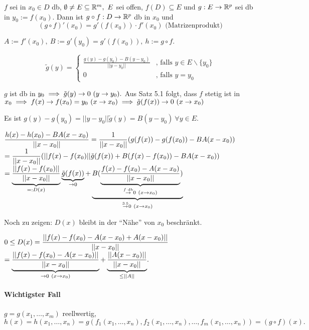 \documentclass[a4paper,twoside,DIV15,BCOR12mm]{scrbook}
\begin{document}
\begin{satz}[Kettenregel]
$f$ sei in $x_0 \in D$ db, $\emptyset \ne E \subseteq \MdR^m,\ E$ sei offen, $f(D) \subseteq E$ und $g:E \to \mathbb{R}^p$ sei db in $y_0 := f(x_0)$. Dann ist $g \circ f: D \to \mathbb{R}^p$ db in $x_0$ und $$(g \circ f)'(x_0) = g'(f(x_0))\cdot f'(x_0)\text{ (Matrizenprodukt)}$$
\end{satz}

\begin{beweis}
$A := f'(x_0),\ B := g'(y_0) = g'(f(x_0)),\ h := g \circ f.$

$$\tilde{g}(y) = \begin{cases}
\frac{g(y)-g(y_0)-B(y-y_0)}{||y-y_0||} & \text{, falls } y \in E\backslash\{y_0\} \\
0                                      & \text{, falls } y = y_0
\end{cases}$$

$g$ ist db in $y_0 \implies \tilde{g}(y) \to 0\ (y \to y_0).$ Aus Satz 5.1 folgt, dass $f$ stetig ist in $x_0 \implies f(x) \to f(x_0) = y_0\ (x \to x_0) \implies \tilde{g}(f(x)) \to 0\ (x \to x_0)$

Es ist $g(y) - g(y_0) = ||y-y_0|| \tilde{g}(y) = B(y-y_0)\ \forall y \in E.$

$\displaystyle{\frac{h(x)-h(x_0)-BA(x-x_0)}{||x-x_0||} = \frac{1}{||x-x_0||}(g(f(x))-g(f(x_0))-BA(x-x_0))}$\\
$\displaystyle{= \frac{1}{||x-x_0||} (||f(x)-f(x_0)|| \tilde{g}(f(x)) + B(f(x)-f(x_0))-BA(x-x_0))}$\\
$\displaystyle{= \underbrace{\frac{||f(x)-f(x_0)||}{||x-x_0||}}_{=:D(x)} \underbrace{\tilde{g}(f(x))}_{\to 0} + \underbrace{B(\underbrace{\frac{f(x)-f(x_0)-A(x-x_0)}{||x-x_0||}}_{\overset{f\text{ db}}{\to} 0\ (x \to x_0)})}_{\overset{\text{3.5}}{\to} 0\ (x \to x_0)}}$

Noch zu zeigen: $D(x)$ bleibt in der "`Nähe"' von $x_0$ beschränkt.

$0 \le D(x) = \displaystyle{\frac{||f(x)-f(x_0)-A(x-x_0)+A(x-x_0)||}{||x-x_0||}}$\\
$\displaystyle{= \underbrace{\frac{||f(x)-f(x_0)-A(x-x_0)||}{||x-x_0||}}_{\to 0\ (x \to x_0)} + \underbrace{\frac{||A(x-x_0)||}{||x-x_0||}}_{\le ||A||}}.$
\end{beweis}

\paragraph{Wichtigster Fall} $g = g(x_1,\ldots,x_m)$ reellwertig, $h(x) = h(x_1,\ldots,x_n) = g(f_1(x_1,\ldots,x_n),f_2(x_1,\ldots,x_n),\ldots,f_m(x_1,\ldots,x_n)) = (g \circ f)(x).$
\end{document}
